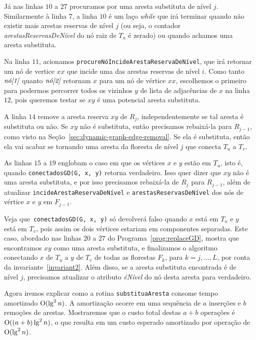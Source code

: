 Já nas linhas $10$ a $27$ procuramos por uma aresta substituta de nível $j$. Similarmente à linha $7$, a linha $10$ é um laço \textit{while} que irá terminar quando não existir mais arestas reservas de nível $j$ (ou seja, o contador \textit{arestasReservasDeNível} do nó raiz de $T_u$ é zerado) ou quando achamos uma aresta substituta.  

Na linha $11$, acionamos \texttt{procureNóIncideArestaReservaDeNível}, que irá retornar um nó de vertice $xx$ que incide uma das arestas reservas de nível $i$. Como tanto $\emph{nó[1]}$ quanto $\emph{nó[2]}$ retornam $x$ para um nó de vértice $xx$, escolhemos o primeiro para podermos percorrer todos os vizinhos $y$ de lista de adjacências de $x$ na linha $12$, pois queremos testar se $xy$ é uma potencial aresta substituta.

A linha $14$ remove a aresta reserva $xy$ de $R_j$, independentemente se tal aresta é substituta ou não. Se $xy$ não é substituta, então precisamos rebaixá-la para $R_{j-1}$, como visto na Seção~\ref{sec:dynamic-graph-edge-removal}. Se ela é substituta, então ela vai acabar se tornando uma aresta da floresta de nível $j$ que conecta $T_u$ a $T_v$.

As linhas $15$ a $19$ englobam o caso em que os vértices $x$ e $y$ estão em $T_u$, isto é, quando \texttt{conectadosGD(G, x, y)} retorna verdadeiro. Isso quer dizer que $xy$ não é uma aresta substituta, e por isso precisamos rebaixá-la de $R_j$ para $R_{j-1}$, além de atualizar \texttt{incideArestaReservaDeNível} e \texttt{arestasReservasDeNível} dos nós de vértice $x$ e $y$ em $F_{j-1}$. 

Veja que~\texttt{conectadosGD(G, x, y)} só devolverá falso quando $x$ está em $T_u$ e $y$ está em $T_v$, pois assim os dois vértices estariam em componentes separadas. Este caso, abordado nas linhas $20$ a $27$ do Programa~\ref{prog:replaceGD}, mostra que encontramos $xy$ como uma aresta substituta, e finalizamos o algoritmo conectando $x$ de $T_u$ a $y$ de $T_v$ de todas as florestas $F_k$, para $k = j, \ldots, L$, por conta da invariante~\ref{invariant2}. Além disso, se a aresta substituta encontrada é de nível $j$, precisamos atualizar o atributo \textit{éNível} do nó desta aresta para verdadeiro.

Agora iremos explicar como a rotina \texttt{substituaAresta} consome tempo amortizado $\mathrm{O}(\lg^2 n)$. A amortização ocorre em uma sequência de $a$ inserções e $b$ remoções de arestas. Mostraremos que o custo total destas $a + b$ operações é $\mathrm{O}((a + b) \lg^2 n)$, o que resulta em um custo esperado amortizado por operação de $\mathrm{O}(\lg^2 n)$. 


